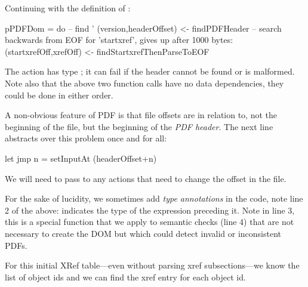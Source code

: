Continuing with the definition of :
\begin{code}
pPDFDom =
    do
    -- find '%
    (version,headerOffset) <- findPDFHeader
    -- search backwards from EOF for 'startxref', gives up after 1000 bytes:
    (startxrefOff,xrefOff) <- findStartxrefThenParseToEOF
\end{code}

The action  has type ;
it can fail if the header cannot be found or is malformed.
%
Note also that the above two function calls have no data dependencies, they
could be done in either order.

A non-obvious feature of PDF is that file offsets are in relation to, not the
beginning of the file, but the beginning of the \emph{PDF header}.
%
The next line abstracts over this problem once and for all:
\begin{code}  
    let jmp n = setInputAt (headerOffset+n)
\end{code}
We will need to pass  to any actions that need to change
the offset in the file.


For the sake of lucidity, we sometimes add \emph{type annotations} in the code,
note line 2 of the above:  indicates the type of
the expression preceding it.
%
Note  in line 3, this is a special function that we apply to
semantic checks (line 4) that are not necessary to create the DOM but which
could detect invalid or inconsistent PDFs.

For this initial XRef table---even without parsing xref subsections---we
know the list of object ids and we can find the xref entry for each object id.

